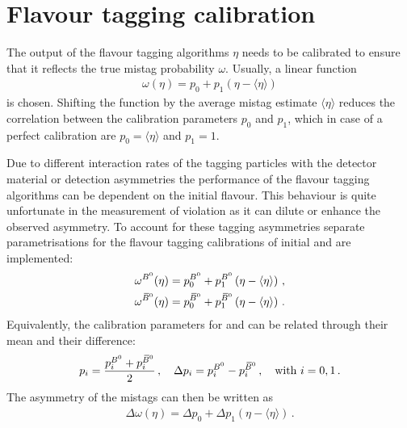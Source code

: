 
\section{Flavour tagging calibration}
\label{sec:dataanalysis:taggingcalibration}

The output of the flavour tagging algorithms $\eta$ needs to be calibrated to
ensure that it reflects the true mistag probability $\omega$. Usually, a
linear function
\begin{align}
	\omega(\eta) = p_0 + p_1 (\eta - \langle\eta\rangle)
\label{eq:dataanalysis:taggingcalibration:generalfunction}
\end{align}
is chosen. Shifting the function by the average mistag estimate
$\langle\eta\rangle$ reduces the correlation between the calibration
parameters $p_0$ and $p_1$, which in case of a perfect calibration are
$p_0 = \langle\eta\rangle$ and $p_1 = 1$.

Due to different interaction rates of the tagging particles with the detector
material or detection asymmetries the performance of the flavour tagging
algorithms can be dependent on the initial flavour. This behaviour is quite
unfortunate in the measurement of \CP violation as it can dilute or enhance
the observed asymmetry. To account for these tagging asymmetries separate
parametrisations for the flavour tagging calibrations of initial \Bd and \Bzb
are implemented:
\begin{equation}
\begin{split}
  \omega^{{{B}^0} }(\eta) = p_0^{{{B}^0} } + p_1^{{{B}^0} }\left(\eta - \langle\eta\rangle\right) \, , \\
  \omega^{{{\kern 0.18em\overline{\kern -0.18em B}{}}{}^0}}(\eta) = p_0^{{{\kern 0.18em\overline{\kern -0.18em B}{}}{}^0}} + p_1^{{{\kern 0.18em\overline{\kern -0.18em B}{}}{}^0}}\left(\eta - \langle\eta\rangle\right) \, .
\end{split}
\label{eq:dataanalysis:taggingcalibration:individual_parametrisations}
\end{equation}
Equivalently, the calibration parameters for \Bd and \Bzb can be related
through their mean and their difference:
\begin{equation}
  p_i        = \frac{p_i^{{{B}^0} } + p_i^{{{\kern 0.18em\overline{\kern -0.18em B}{}}{}^0}}}{2} \, , \quad
  \Delta p_i = p_i^{{{B}^0} } - p_i^{{{\kern 0.18em\overline{\kern -0.18em B}{}}{}^0}} \, , \quad
  \text{with }i = 0,1 \,.
\label{eq:dataanalysis:taggingcalibration:individual_pis}
\end{equation}
The asymmetry of the mistags can then be written as
\begin{align}
	\Delta\omega(\eta) = \Delta p_0 + \Delta p_1 (\eta - \langle\eta\rangle)\,.
\label{eq:dataanalysis:taggingcalibration:mistagasymmetry}
\end{align}


